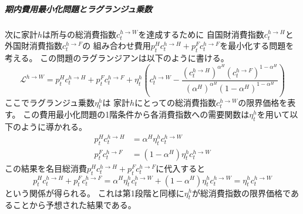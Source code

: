 \subparagraph{期内費用最小化問題とラグランジュ乗数}
次に家計\(h\)は所与の総消費指数\(c_t^{h\to W}\)を達成するために
自国財消費指数\(c_t^{h\to H}\)と外国財消費指数\(c_t^{h\to F}\)の
組み合わせ費用\(p_t^Hc_t^{h\to H}+p_t^Fc_t^{h\to F}\)を最小化する問題を考える。
この問題のラグランジアンは以下のように書ける。
\begin{equation}
\label{form:model_households_indices_aggregation_stage1b_home_lagrangian_def}
    \mathcal{L}^{h\to W}=p_t^Hc_t^{h\to H}+p_t^Fc_t^{h\to F}+\eta_t^h\left(c_t^{h\to W}-\frac{(c_t^{h\to H})^{\alpha^H}(c_t^{h\to F})^{1-\alpha^H}}{(\alpha^H)^{\alpha^H}(1-\alpha^H)^{1-\alpha^H}}\right)
\end{equation}
ここでラグランジュ乗数\(\eta_t^h\)は
家計\(h\)にとっての総消費指数\(c_t^{h\to W}\)の限界価格を表す。
この費用最小化問題の1階条件から各消費指数への需要関数は\(\eta_t^h\)を用いて以下のように導かれる。
\begin{align}
    \label{form:model_households_indices_aggregation_stage1b_home_p_H_c_h_H_eq}
        p_t^Hc_t^{h\to H}&=\alpha^H\eta_t^hc_t^{h\to W} \\
    \label{form:model_households_indices_aggregation_stage1b_home_p_F_c_h_F_eq}
        p_t^Fc_t^{h\to F}&=(1-\alpha^H)\eta_t^hc_t^{h\to W}
\end{align}
この結果を名目総消費\(p_t^Hc_t^{h\to H}+p_t^Fc_t^{h\to F}\)に代入すると
\begin{equation}
\label{form:model_households_indices_aggregation_stage1b_home_total_nominal_consumption_eq}
    p_t^Hc_t^{h\to H}+p_t^Fc_t^{h\to F}=\alpha^H\eta_t^hc_t^{h\to W}+(1-\alpha^H)\eta_t^hc_t^{h\to W}=\eta_t^hc_t^{h\to W}
\end{equation}
という関係が得られる。
これは第1段階と同様に\(\eta_t^h\)が総消費指数の限界価格であることから予想された結果である。

